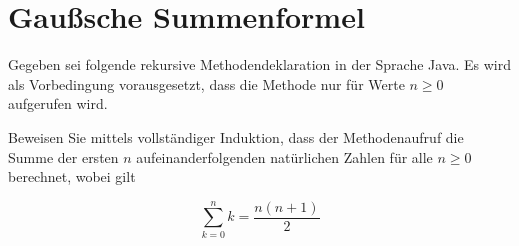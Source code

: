 \documentclass{lehramt-informatik-aufgabe}
\begin{document}
\let\m=\liInduktionMarkierung
\let\e=\liInduktionErklaerung


\section{Gaußsche Summenformel
}

Gegeben sei folgende rekursive Methodendeklaration in der Sprache Java.
Es wird als Vorbedingung vorausgesetzt, dass die Methode 
nur für Werte $n \geq 0$ aufgerufen wird.


\noindent
Beweisen Sie mittels vollständiger Induktion, dass der Methodenaufruf
 die Summe der ersten $n$ aufeinanderfolgenden
natürlichen Zahlen für alle $n \geq 0$ berechnet, wobei gilt

\begin{displaymath}
\sum_{k=0}^{n}k = \frac{n(n+1)}{2}
\end{displaymath}
\end{document}
